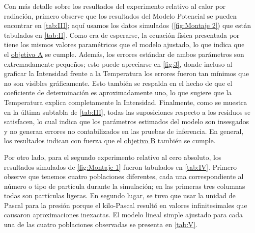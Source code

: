 \documentclass[12pt,a4paper]{config/myConfig}
\begin{document}
Con más detalle sobre los resultados del experimento relativo al calor por radiación, primero observe que los resultados del Modelo Potencial se pueden encontrar en \cref{tab:III}; aquí usamos los datos simulados (\cref{fig:Montaje 2}) que están tabulados en \cref{tab:II}. Como era de esperarse, la ecuación física presentada por \citet{physicsTextbook} tiene los mismos valores paramétricos que el modelo ajustado, lo que indica que el \hyperref[obj:A]{objetivo A} se cumple. Además, los errores estándar de ambos parámetros son extremadamente pequeños; esto puede apreciarse en \cref{fig:3}, donde incluso al graficar la Intensidad frente a la Temperatura los errores fueron tan mínimos que no son visibles gráficamente. Esto también se respalda en el hecho de que el coeficiente de determinación es aproximadamente uno, lo que sugiere que la Temperatura explica completamente la Intensidad. Finalmente, como se muestra en la última subtabla de \cref{tab:III}, todas las suposiciones respecto a los residuos se satisfacen, lo cual indica que los parámetros estimados del modelo son insesgados y no generan errores no contabilizados en las pruebas de inferencia. En general, los resultados indican con fuerza que el \hyperref[obj:B]{objetivo B} también se cumple. \newline

Por otro lado, para el segundo experimento relativo al cero absoluto, los resultados simulados de \cref{fig:Montaje 1} fueron tabulados en \cref{tab:IV}. Primero observe que tenemos cuatro poblaciones diferentes, cada una correspondiente al número o tipo de partícula durante la simulación; en las primeras tres columnas todas son partículas ligeras. En segundo lugar, se tuvo que usar la unidad de Pascal para la presión porque el kilo-Pascal resultó en valores infinitesimales que causaron aproximaciones inexactas. El modelo lineal simple ajustado para cada una de las cuatro poblaciones observadas se presenta en \cref{tab:V}. \newline
\end{document}
